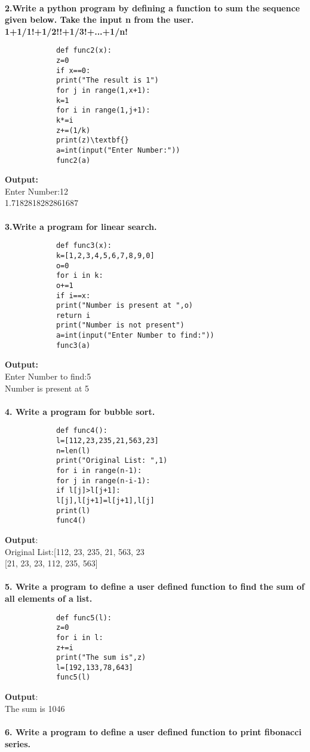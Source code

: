 \documentclass[
a4paper]{article}
\begin{document}
\begin{large}
		\textbf{\\2.Write a python program by defining a function to sum the sequence given below. Take the input n from the user. 1+1/1!+1/2!!+1/3!+...+1/n!}
		\begin{verbatim}
			def func2(x):
			z=0
			if x==0:
			print("The result is 1")
			for j in range(1,x+1):
			k=1
			for i in range(1,j+1):
			k*=i
			z+=(1/k)
			print(z)\textbf{}          
			a=int(input("Enter Number:"))
			func2(a)
		\end{verbatim}
		\textbf{Output:\\}
		Enter Number:12\\
		1.7182818282861687\\
		\textbf{\\3.Write a program for linear search.}
		\begin{verbatim}
			def func3(x):
			k=[1,2,3,4,5,6,7,8,9,0]
			o=0
			for i in k:
			o+=1
			if i==x:
			print("Number is present at ",o)
			return i
			print("Number is not present")
			a=int(input("Enter Number to find:"))
			func3(a)
		\end{verbatim}
		\textbf{Output:\\}
		Enter Number to find:5\\
		Number is present at  5\\
		\\\textbf{4. Write a program for bubble sort.}
		\begin{verbatim}
			def func4():
			l=[112,23,235,21,563,23]
			n=len(l)
			print("Original List: ",1)
			for i in range(n-1):
			for j in range(n-i-1):
			if l[j]>l[j+1]:
			l[j],l[j+1]=l[j+1],l[j]
			print(l)
			func4()
		\end{verbatim}
		\textbf{Output}:\\
		Original List:{[112, 23, 235, 21, 563, 23}\\
		{[21, 23, 23, 112, 235, 563]}\\
		\\\textbf{5. Write a program to define a user defined function to find the sum of all elements
			of a list.}
		\begin{verbatim}
			def func5(l):
			z=0
			for i in l:
			z+=i
			print("The sum is",z)
			l=[192,133,78,643]
			func5(l)
		\end{verbatim}
		\textbf{Output}:\\
		The sum is 1046
		\\
		\\\textbf{6. Write a program to define a user defined function to print fibonacci series.}

\end{large}
\end{document}
